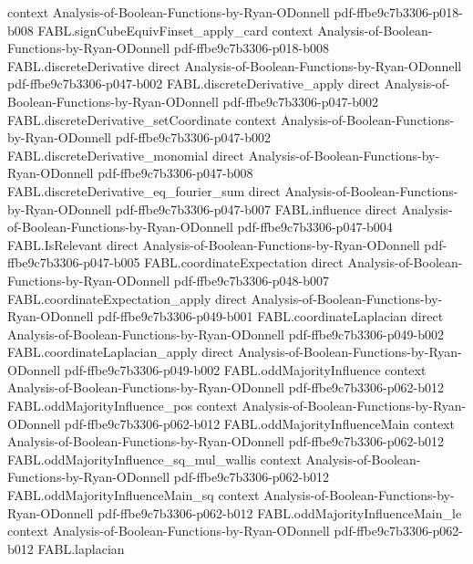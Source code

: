 \begin{theorem}
  {context}
  {Analysis-of-Boolean-Functions-by-Ryan-ODonnell}
  {pdf-ffbe9c7b3306-p018-b008}
\proofstep
  {FABL.signCubeEquivFinset_apply_card}
  {context}
  {Analysis-of-Boolean-Functions-by-Ryan-ODonnell}
  {pdf-ffbe9c7b3306-p018-b008}
\proofstep
  {FABL.discreteDerivative}
  {direct}
  {Analysis-of-Boolean-Functions-by-Ryan-ODonnell}
  {pdf-ffbe9c7b3306-p047-b002}
\proofstep
  {FABL.discreteDerivative_apply}
  {direct}
  {Analysis-of-Boolean-Functions-by-Ryan-ODonnell}
  {pdf-ffbe9c7b3306-p047-b002}
\proofstep
  {FABL.discreteDerivative_setCoordinate}
  {context}
  {Analysis-of-Boolean-Functions-by-Ryan-ODonnell}
  {pdf-ffbe9c7b3306-p047-b002}
\proofstep
  {FABL.discreteDerivative_monomial}
  {direct}
  {Analysis-of-Boolean-Functions-by-Ryan-ODonnell}
  {pdf-ffbe9c7b3306-p047-b008}
\proofstep
  {FABL.discreteDerivative_eq_fourier_sum}
  {direct}
  {Analysis-of-Boolean-Functions-by-Ryan-ODonnell}
  {pdf-ffbe9c7b3306-p047-b007}
\proofstep
  {FABL.influence}
  {direct}
  {Analysis-of-Boolean-Functions-by-Ryan-ODonnell}
  {pdf-ffbe9c7b3306-p047-b004}
\proofstep
  {FABL.IsRelevant}
  {direct}
  {Analysis-of-Boolean-Functions-by-Ryan-ODonnell}
  {pdf-ffbe9c7b3306-p047-b005}
\proofstep
  {FABL.coordinateExpectation}
  {direct}
  {Analysis-of-Boolean-Functions-by-Ryan-ODonnell}
  {pdf-ffbe9c7b3306-p048-b007}
\proofstep
  {FABL.coordinateExpectation_apply}
  {direct}
  {Analysis-of-Boolean-Functions-by-Ryan-ODonnell}
  {pdf-ffbe9c7b3306-p049-b001}
\proofstep
  {FABL.coordinateLaplacian}
  {direct}
  {Analysis-of-Boolean-Functions-by-Ryan-ODonnell}
  {pdf-ffbe9c7b3306-p049-b002}
\proofstep
  {FABL.coordinateLaplacian_apply}
  {direct}
  {Analysis-of-Boolean-Functions-by-Ryan-ODonnell}
  {pdf-ffbe9c7b3306-p049-b002}
\proofstep
  {FABL.oddMajorityInfluence}
  {context}
  {Analysis-of-Boolean-Functions-by-Ryan-ODonnell}
  {pdf-ffbe9c7b3306-p062-b012}
\proofstep
  {FABL.oddMajorityInfluence_pos}
  {context}
  {Analysis-of-Boolean-Functions-by-Ryan-ODonnell}
  {pdf-ffbe9c7b3306-p062-b012}
\proofstep
  {FABL.oddMajorityInfluenceMain}
  {context}
  {Analysis-of-Boolean-Functions-by-Ryan-ODonnell}
  {pdf-ffbe9c7b3306-p062-b012}
\proofstep
  {FABL.oddMajorityInfluence_sq_mul_wallis}
  {context}
  {Analysis-of-Boolean-Functions-by-Ryan-ODonnell}
  {pdf-ffbe9c7b3306-p062-b012}
\proofstep
  {FABL.oddMajorityInfluenceMain_sq}
  {context}
  {Analysis-of-Boolean-Functions-by-Ryan-ODonnell}
  {pdf-ffbe9c7b3306-p062-b012}
\proofstep
  {FABL.oddMajorityInfluenceMain_le}
  {context}
  {Analysis-of-Boolean-Functions-by-Ryan-ODonnell}
  {pdf-ffbe9c7b3306-p062-b012}
\proofstep
  {FABL.laplacian}

\end{theorem}
